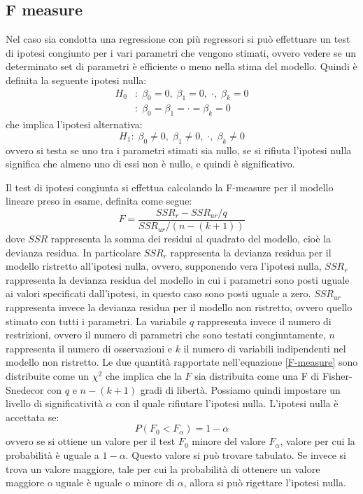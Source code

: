 \subsection{F measure}
Nel caso sia condotta una regressione con più regressori si può effettuare un test di ipotesi congiunto per i vari parametri che vengono stimati, ovvero vedere se un determinato set di parametri è efficiente o meno nella stima del modello. Quindi è definita la seguente ipotesi nulla:
\begin{equation}
\begin{split}
H_0 &: \; \beta_0 = 0 ,\; \beta_1 = 0,\; \cdot ,\; \beta_k = 0 \\
&:\; \beta_0 =  \beta_1 = \cdot = \beta_k = 0
\end{split}
\end{equation}
che implica l'ipotesi alternativa:
\begin{equation}
H_1: \; \beta_0 \neq 0 ,\; \beta_1 \neq 0,\; \cdot ,\; \beta_k \neq 0
\end{equation}
ovvero si testa se uno tra i parametri stimati sia nullo, se si rifiuta l'ipotesi nulla significa che almeno uno di essi non è nullo, e quindi è significativo.

Il test di ipotesi congiunta si effettua calcolando la F-measure per il modello lineare preso in esame, definita come segue:
\begin{equation}
F = \frac{SSR_r - SSR_{ur}/q}{SSR_{ur}/(n-(k+1))}
\label{F-measure}
\end{equation}
dove $SSR$ rappresenta la somma dei residui al quadrato del modello, cioè la devianza residua. In particolare $SSR_r$ rappresenta la devianza residua per il modello ristretto all'ipotesi nulla, ovvero, supponendo vera l'ipotesi nulla, $SSR_r$ rappresenta la devianza residua del modello in cui i parametri sono posti uguale ai valori specificati dall'ipotesi, in questo caso sono posti uguale a zero. $SSR_{ur}$ rappresenta invece la devianza residua per il modello non ristretto, ovvero quello stimato con tutti i parametri. La variabile $q$ rappresenta invece il numero di restrizioni, ovvero il numero di parametri che sono testati congiuntamente, $n$ rappresenta il numero di osservazioni e $k$ il numero di variabili indipendenti nel modello non ristretto. Le due quantità rapportate nell'equazione \eqref{F-measure} sono distribuite come un $\chi^2$ che implica che la $F$ sia distribuita come una F di Fisher-Snedecor con $q$ e $n-(k+1)$ gradi di libertà. Possiamo quindi impostare un livello di significatività $\alpha$ con il quale rifiutare l'ipotesi nulla. L'ipotesi nulla è accettata se:
\begin{equation}
P(F_0 < F_\alpha) = 1-\alpha
\end{equation}
ovvero se si ottiene un valore per il test $F_0$ minore del valore $F_\alpha$, valore per cui la probabilità è uguale a $1-\alpha$. Questo valore si può trovare tabulato. Se invece si trova un valore maggiore, tale per cui la probabilità di ottenere un valore maggiore o uguale è uguale o minore di $\alpha$, allora si può rigettare l'ipotesi nulla.
